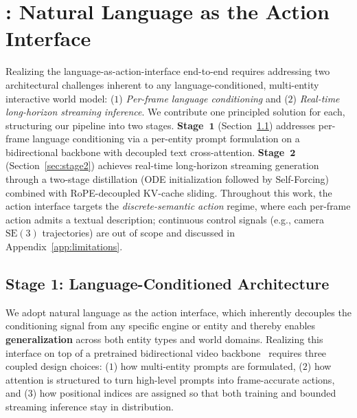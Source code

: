 \section{\methodname: Natural Language as the Action Interface}
\label{sec:method}

Realizing the language-as-action-interface end-to-end requires
addressing two architectural challenges inherent to any language-conditioned,
multi-entity interactive world model:
($1$) \emph{Per-frame language conditioning} and ($2$)
\emph{Real-time long-horizon streaming inference}.
We contribute one principled solution for each, structuring our pipeline into two stages.
\textbf{Stage~$\mathbf{1}$} (Section~\ref{sec:stage1}) addresses per-frame language conditioning
via a per-entity prompt formulation on a bidirectional backbone with decoupled
text cross-attention.
\textbf{Stage~$\mathbf{2}$} (Section~\ref{sec:stage2}) achieves real-time long-horizon
streaming generation through a two-stage distillation (ODE initialization followed by
Self-Forcing) combined with RoPE-decoupled KV-cache sliding.
Throughout this work, the action interface targets the
\emph{discrete-semantic action} regime, 
where each per-frame action
admits a textual description; 
continuous control signals (e.g., camera
$\mathrm{SE}(3)$ trajectories) are out of scope and discussed in
Appendix~\ref{app:limitations}.

\subsection{Stage 1: Language-Conditioned Architecture}
\label{sec:stage1}

We adopt natural language as the action interface, which inherently 
decouples the conditioning signal from any specific engine or entity and 
thereby enables \textbf{generalization} across both entity types and world domains. 
Realizing this interface on top of a pretrained bidirectional video 
backbone~\citep{wang2025wan} requires three coupled design choices: 
($1$) how multi-entity prompts are formulated, 
($2$) how attention is structured to turn 
high-level prompts into frame-accurate actions, and ($3$) how positional 
indices are assigned so that both training and bounded streaming inference 
stay in distribution.

